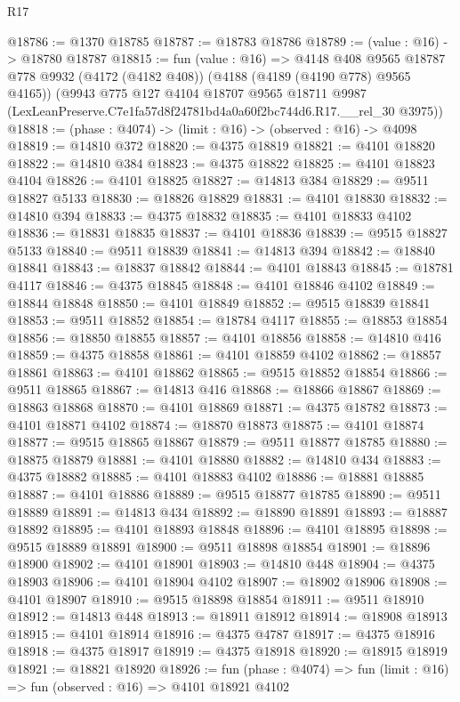 \begin{lexlean}{R17}
\begin{coremodule}
@18786 := @1370 @18785
@18787 := @18783 @18786
@18789 := (value : @16) -> @18780 @18787
@18815 := fun (value : @16) =>
  @4148
    @408
    @9565
    @18787
    @778
    @9932
    (@4172 (@4182 @408))
    (@4188 (@4189 (@4190 @778) @9565 @4165))
    (@9943
      @775
      @127
      @4104
      @18707
      @9565
      @18711
      @9987
      (LexLeanPreserve.C7e1fa57d8f24781bd4a0a60f2bc744d6.R17.__rel_30 @3975))
@18818 := (phase : @4074) -> (limit : @16) -> (observed : @16) -> @4098
@18819 := @14810 @372
@18820 := @4375 @18819
@18821 := @4101 @18820
@18822 := @14810 @384
@18823 := @4375 @18822
@18825 := @4101 @18823 @4104
@18826 := @4101 @18825
@18827 := @14813 @384
@18829 := @9511 @18827 @5133
@18830 := @18826 @18829
@18831 := @4101 @18830
@18832 := @14810 @394
@18833 := @4375 @18832
@18835 := @4101 @18833 @4102
@18836 := @18831 @18835
@18837 := @4101 @18836
@18839 := @9515 @18827 @5133
@18840 := @9511 @18839
@18841 := @14813 @394
@18842 := @18840 @18841
@18843 := @18837 @18842
@18844 := @4101 @18843
@18845 := @18781 @4117
@18846 := @4375 @18845
@18848 := @4101 @18846 @4102
@18849 := @18844 @18848
@18850 := @4101 @18849
@18852 := @9515 @18839 @18841
@18853 := @9511 @18852
@18854 := @18784 @4117
@18855 := @18853 @18854
@18856 := @18850 @18855
@18857 := @4101 @18856
@18858 := @14810 @416
@18859 := @4375 @18858
@18861 := @4101 @18859 @4102
@18862 := @18857 @18861
@18863 := @4101 @18862
@18865 := @9515 @18852 @18854
@18866 := @9511 @18865
@18867 := @14813 @416
@18868 := @18866 @18867
@18869 := @18863 @18868
@18870 := @4101 @18869
@18871 := @4375 @18782
@18873 := @4101 @18871 @4102
@18874 := @18870 @18873
@18875 := @4101 @18874
@18877 := @9515 @18865 @18867
@18879 := @9511 @18877 @18785
@18880 := @18875 @18879
@18881 := @4101 @18880
@18882 := @14810 @434
@18883 := @4375 @18882
@18885 := @4101 @18883 @4102
@18886 := @18881 @18885
@18887 := @4101 @18886
@18889 := @9515 @18877 @18785
@18890 := @9511 @18889
@18891 := @14813 @434
@18892 := @18890 @18891
@18893 := @18887 @18892
@18895 := @4101 @18893 @18848
@18896 := @4101 @18895
@18898 := @9515 @18889 @18891
@18900 := @9511 @18898 @18854
@18901 := @18896 @18900
@18902 := @4101 @18901
@18903 := @14810 @448
@18904 := @4375 @18903
@18906 := @4101 @18904 @4102
@18907 := @18902 @18906
@18908 := @4101 @18907
@18910 := @9515 @18898 @18854
@18911 := @9511 @18910
@18912 := @14813 @448
@18913 := @18911 @18912
@18914 := @18908 @18913
@18915 := @4101 @18914
@18916 := @4375 @4787
@18917 := @4375 @18916
@18918 := @4375 @18917
@18919 := @4375 @18918
@18920 := @18915 @18919
@18921 := @18821 @18920
@18926 := fun (phase : @4074) => fun (limit : @16) => fun (observed : @16) => @4101 @18921 @4102

\end{coremodule}
\end{lexlean}
